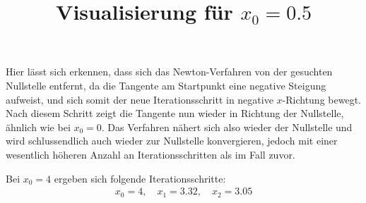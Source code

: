 \documentclass[11pt]{article}
\theoremstyle{plain}
\theoremstyle{definition}
\renewcommand{\a}{\"{a}}
\renewcommand{\o}{\"{o}}
\renewcommand{\u}{\"{u}}
\begin{document}
\begin{figure}[!ht]
\centering
{}

\title{Visualisierung f\u r $x_0=0.5$}
\end{figure}

Hier l\a sst sich erkennen, dass sich das Newton-Verfahren von der gesuchten Nullstelle entfernt, da die Tangente am Startpunkt eine negative Steigung aufweist, und sich somit der neue Iterationsschritt in negative $x$-Richtung bewegt. Nach diesem Schritt zeigt die Tangente nun wieder in Richtung der Nullstelle, \a hnlich wie bei $x_0=0$. Das Verfahren n\a hert sich also wieder der Nullstelle und wird schlussendlich auch wieder zur Nullstelle konvergieren, jedoch mit einer wesentlich h\o heren Anzahl an Iterationsschritten als im Fall zuvor.\vspace{0.3cm}


Bei $x_0=4$ ergeben sich folgende Iterationsschritte:
\begin{align*}
x_0 = 4, \quad x_1 = 3.32, \quad x_2 = 3.05 
\end{align*}
\end{document}
